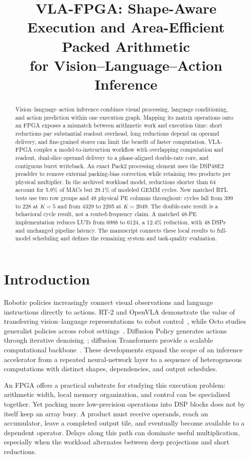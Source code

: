 \documentclass[10pt,conference,letterpaper]{IEEEtran}
\title{VLA-FPGA: Shape-Aware Execution and Area-Efficient Packed Arithmetic\protect\\for Vision--Language--Action Inference}
\author{\IEEEauthorblockN{Author information to be added}\IEEEauthorblockA{Revision 3 --- September 12, 2026}}
\begin{document}
\maketitle
\begin{abstract}
Vision--language--action inference combines visual processing, language conditioning, and action prediction within one execution graph. Mapping its matrix operations onto an FPGA exposes a mismatch between arithmetic work and execution time: short reductions pay substantial readout overhead, long reductions depend on operand delivery, and fine-grained stores can limit the benefit of faster computation. VLA-FPGA couples a model-to-instruction workflow with overlapping computation and readout, dual-slice operand delivery to a phase-aligned double-rate core, and contiguous burst writeback. An exact Pack2 processing element uses the DSP48E2 preadder to remove external packing-bias correction while retaining two products per physical multiplier. In the archived workload model, reductions shorter than 64 account for 5.9\% of MACs but 29.1\% of modeled GEMM cycles. New matched RTL tests use two row groups and 48 physical PE columns throughout: cycles fall from 399 to 228 at $K=5$ and from 4329 to 2205 at $K=2049$. The double-rate result is a behavioral cycle result, not a routed-frequency claim. A matched 48-PE implementation reduces LUTs from 6988 to 6124, a 12.4\% reduction, with 48 DSPs and unchanged pipeline latency. The manuscript connects these local results to full-model scheduling and defines the remaining system and task-quality evaluation.
\end{abstract}

\section{Introduction}
Robotic policies increasingly connect visual observations and language instructions directly to actions. RT-2 and OpenVLA demonstrate the value of transferring vision--language representations to robot control~\cite{rt2,openvla}, while Octo studies generalist policies across robot settings~\cite{octo}. Diffusion Policy generates actions through iterative denoising~\cite{diffpolicy}; diffusion Transformers provide a scalable computational backbone~\cite{dit}. These developments expand the scope of an inference accelerator from a repeated neural-network layer to a sequence of heterogeneous computations with distinct shapes, dependencies, and output schedules.

An FPGA offers a practical substrate for studying this execution problem: arithmetic width, local memory organization, and control can be specialized together. Yet packing more low-precision operations into DSP blocks does not by itself keep an array busy. A product must receive operands, reach an accumulator, leave a completed output tile, and eventually become available to a dependent operator. Delays along this path can dominate useful multiplication, especially when the workload alternates between deep projections and short reductions.
\end{document}
